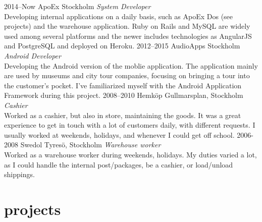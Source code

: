 \documentclass[]{friggeri-cv} %
\begin{document}
\begin{entrylist}
\entry
{2014--Now}
{ApoEx}
{Stockholm}
{\emph{System Developer} \\
Developing internal applications on a daily basis, such as ApoEx Dos (see projects) and the warehouse application. Ruby on Rails and MySQL are widely used among several platforms and the newer includes technologies as AngularJS and PostgreSQL and deployed on Heroku.}
\entry
{2012--2015}
{AudioApps}
{Stockholm}
{\emph{Android Developer} \\
Developing the Android version of the moblie application. The application mainly are used by museums and city tour companies, focusing on bringing a tour into the customer's pocket. I've familiarized myself with the Android Application Framework during this project.}
\entry
{2008--2010}
{Hemköp}
{Gullmarsplan, Stockholm}
{\emph{Cashier} \\
Worked as a cashier, but also in store, maintaining the goods. It was a great experience to get in touch with a lot of customers daily, with different requests. I usually worked at weekends, holidays, and whenever I could get off school.}
\entry
{2006-2008}
{Swedol}
{Tyresö, Stockholm}
{\emph{Warehouse worker} \\
Worked as a warehouse worker during weekends, holidays. My duties varied a lot, as I could handle the internal post/packages, be a cashier, or load/unload shippings.}
\end{entrylist}

\clearpage


\section{projects}
\end{document}
